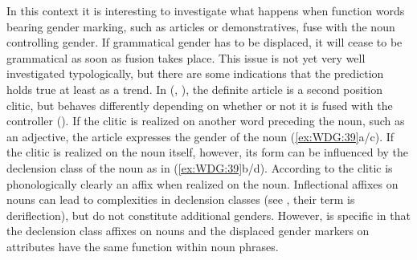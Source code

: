 \documentclass[output=collectionpaper]{langsci/langscibook}
\begin{document}
In this context it is interesting to investigate what happens when function words bearing gender marking, such as articles or demonstratives, fuse with the noun controlling gender. If grammatical gender has to be displaced, it will cease to be grammatical as soon as fusion takes place. This issue is not yet very well investigated typologically, but there are some indications that the prediction holds true at least as a trend. In  (, ), the definite article is a second position clitic, but behaves differently depending on whether or not it is fused with the controller (\citealt[315]{Enger2012}). If the clitic is realized on another word preceding the noun, such as an adjective, the article expresses the gender of the noun (\ref{ex:WDG:39}a/c). If the clitic is realized on the noun itself, however, its form can be influenced by the declension class of the noun as in (\ref{ex:WDG:39}b/d). According to \cite[134]{Dost2006} the clitic is phonologically clearly an affix when realized on the noun. Inflectional affixes on nouns can lead to complexities in declension classes (see , their term is deriflection), but do not constitute additional genders. However,  is specific in that the declension class affixes on nouns and the displaced gender markers on attributes have the same function within noun phrases.

%
\end{document}
